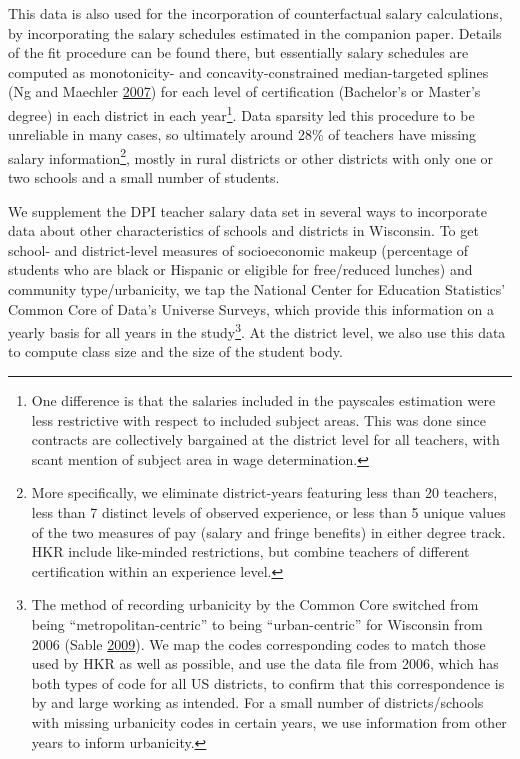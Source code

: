 \documentclass[12pt,]{article}
\let\rmarkdownfootnote\footnote%
\def\footnote{\protect\rmarkdownfootnote}
\begin{document}
This data is also used for the incorporation of counterfactual salary
calculations, by incorporating the salary schedules estimated in the
companion paper. Details of the fit procedure can be found there, but
essentially salary schedules are computed as monotonicity- and
concavity-constrained median-targeted splines (Ng and Maechler
\protect\hyperlink{ref-ng}{2007}) for each level of certification
(Bachelor's or Master's degree) in each district in each year\footnote{One
  difference is that the salaries included in the payscales estimation
  were less restrictive with respect to included subject areas. This was
  done since contracts are collectively bargained at the district level
  for all teachers, with scant mention of subject area in wage
  determination.}. Data sparsity led this procedure to be unreliable in
many cases, so ultimately around 28\% of teachers have missing salary
information\footnote{More specifically, we eliminate district-years
  featuring less than 20 teachers, less than 7 distinct levels of
  observed experience, or less than 5 unique values of the two measures
  of pay (salary and fringe benefits) in either degree track. HKR
  include like-minded restrictions, but combine teachers of different
  certification within an experience level.}, mostly in rural districts
or other districts with only one or two schools and a small number of
students.

We supplement the DPI teacher salary data set in several ways to
incorporate data about other characteristics of schools and districts in
Wisconsin. To get school- and district-level measures of socioeconomic
makeup (percentage of students who are black or Hispanic or eligible for
free/reduced lunches) and community type/urbanicity, we tap the National
Center for Education Statistics' Common Core of Data's Universe Surveys,
which provide this information on a yearly basis for all years in the
study\footnote{The method of recording urbanicity by the Common Core
  switched from being ``metropolitan-centric'' to being
  ``urban-centric'' for Wisconsin from 2006 (Sable
  \protect\hyperlink{ref-sable}{2009}). We map the codes corresponding
  codes to match those used by HKR as well as possible, and use the data
  file from 2006, which has both types of code for all US districts, to
  confirm that this correspondence is by and large working as intended.
  For a small number of districts/schools with missing urbanicity codes
  in certain years, we use information from other years to inform
  urbanicity.}. At the district level, we also use this data to compute
class size and the size of the student body.
\end{document}
